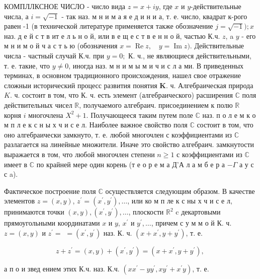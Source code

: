 \documentclass[10pt]{article}
\begin{document}
КОМПЛЛКСНОЕ ЧИСЛО - число вида $z=x+i y$, где $x$ и $y$-действительные числа, а $i=\sqrt{-1}$ - так наз. м н и м а я е д и н и а, т. е. число, квадрат к-рого равен -1 (в технической литературе применяется также обозначение $j=\sqrt{-1}) ; x$ наз. д е й с т в ит е л ь н о й, или в е щ е с т в е н н о й, частью К.ч. $z$, a $y$ - его м н и м о й ч а с т ь ю (обозначения $x=\operatorname{Re} z, \quad y=\operatorname{Im} z)$. Действительные числа - частный случай К.ч. при $y=0 ;$ К. ч., не являющиеся действительными, т. е. такие, что $y \neq 0$, иногда наз. м н и м ы м и ч и с л а ми. В приведенных терминах, в основном традиционного происхождения, нашел свое отражение сложныи исторический процесс развития понятия $\mathbf{K}$. ч. Алгебраическая природа $K$. ч. состоит в том, что К. ч. есть элемент (алгебраического) расширения $\mathbb{C}$ поля действительных чисел $\mathbb{R}$, получаемого алгебраич. присоединением к полю $\mathbb{R}$ корня $i$ многочлена $X^{2}+1$. Получающееся таким путем поле $\mathbb{C}$ наз. п о л е м к о м п л е к с н ы х ч и с е л. Наиболее важное свойство поля $\mathbb{C}$ состоит в том, что оно алгебраически замкнуто, т. е. любой многочлен с коэффициентами из $\mathbb{C}$ разлагается на линейные множители. Иначе это свойство алгебраич. замкнутости выражается в том, что любой многочлен степени $n \geqslant 1$ с коэффициентами из $\mathbb{C}$ имеет в $\mathbb{C}$ по крайней мере один корень (т е о р е м а Д'А л а м б е р а $-\Gamma$ а у с с a).



Фактическое построение поля $\mathbb{C}$ осуществляется следующим образом. В качестве элементов $z=(x, y)$, $z^{\prime}=\left(x^{\prime}, y^{\prime}\right), \ldots$, или ко м п ле к с ны х ч и с е л, принимаются точки $(x, y),\left(x^{\prime}, y^{\prime}\right), \ldots$, плоскости $\mathbb{R}^{2}$ c декартовыми прямоугольными координатами $x$ и $y$, $x^{\prime}$ и $y^{\prime}, \ldots$, причем с у м м о й К. ч. $z=(x, y)$ и $z^{\prime}=$ $=\left(x^{\prime}, y^{\prime}\right)$ наз. К. ч. $\left(x+x^{\prime}, y+y^{\prime}\right)$, т. е.



\[

z+z^{\prime}=(x, y)+\left(x^{\prime}, y^{\prime}\right)=\left(x+x^{\prime}, y+y^{\prime}\right) \text {, }

\]



а п о и звед ением этих К.ч. наз. К.ч. $\left(x x^{\prime}-y y^{\prime}, x y^{\prime}+x^{\prime} y\right)$, т. е.
\end{document}
